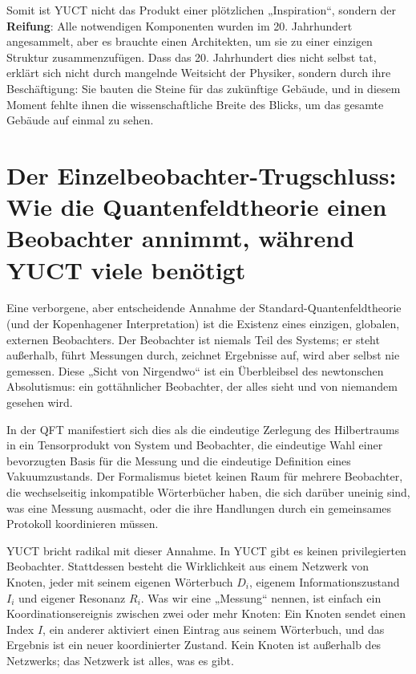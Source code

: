 \documentclass[12pt,a4paper]{article}
\begin{document}
	Somit ist YUCT nicht das Produkt einer plötzlichen „Inspiration“, sondern der \textbf{Reifung}: Alle notwendigen Komponenten wurden im 20. Jahrhundert angesammelt, aber es brauchte einen Architekten, um sie zu einer einzigen Struktur zusammenzufügen. Dass das 20. Jahrhundert dies nicht selbst tat, erklärt sich nicht durch mangelnde Weitsicht der Physiker, sondern durch ihre Beschäftigung: Sie bauten die Steine für das zukünftige Gebäude, und in diesem Moment fehlte ihnen die wissenschaftliche Breite des Blicks, um das gesamte Gebäude auf einmal zu sehen.
	
	\section{Der Einzelbeobachter-Trugschluss: Wie die Quantenfeldtheorie einen Beobachter annimmt, während YUCT viele benötigt}
	
	Eine verborgene, aber entscheidende Annahme der Standard-Quantenfeldtheorie (und der Kopenhagener Interpretation) ist die Existenz eines einzigen, globalen, externen Beobachters. Der Beobachter ist niemals Teil des Systems; er steht außerhalb, führt Messungen durch, zeichnet Ergebnisse auf, wird aber selbst nie gemessen. Diese „Sicht von Nirgendwo“ ist ein Überbleibsel des newtonschen Absolutismus: ein gottähnlicher Beobachter, der alles sieht und von niemandem gesehen wird.
	
	In der QFT manifestiert sich dies als die eindeutige Zerlegung des Hilbertraums in ein Tensorprodukt von System und Beobachter, die eindeutige Wahl einer bevorzugten Basis für die Messung und die eindeutige Definition eines Vakuumzustands. Der Formalismus bietet keinen Raum für mehrere Beobachter, die wechselseitig inkompatible Wörterbücher haben, die sich darüber uneinig sind, was eine Messung ausmacht, oder die ihre Handlungen durch ein gemeinsames Protokoll koordinieren müssen.
	
	YUCT bricht radikal mit dieser Annahme. In YUCT gibt es keinen privilegierten Beobachter. Stattdessen besteht die Wirklichkeit aus einem Netzwerk von Knoten, jeder mit seinem eigenen Wörterbuch \(D_i\), eigenem Informationszustand \(I_i\) und eigener Resonanz \(R_i\). Was wir eine „Messung“ nennen, ist einfach ein Koordinationsereignis zwischen zwei oder mehr Knoten: Ein Knoten sendet einen Index \(I\), ein anderer aktiviert einen Eintrag aus seinem Wörterbuch, und das Ergebnis ist ein neuer koordinierter Zustand. Kein Knoten ist außerhalb des Netzwerks; das Netzwerk ist alles, was es gibt.
	
\end{document}
